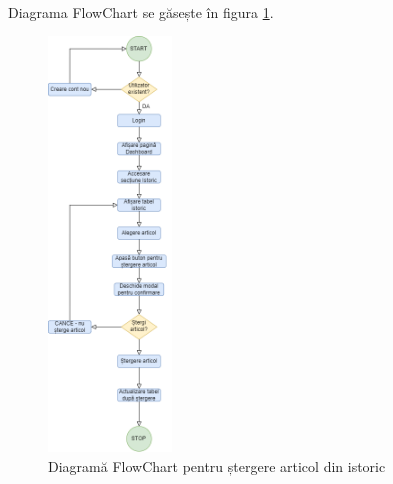 \begin{enumerate}
    \ \\
    Diagrama FlowChart se găsește în figura \ref{fig:deleteArticle}.
    \begin{figure}[H]
        \centering
        \includegraphics[height=110mm]{figs/deleteArticle.png}
        \caption{Diagramă FlowChart pentru ștergere articol din istoric}
        \label{fig:deleteArticle}
    \end{figure}


\end{enumerate}
